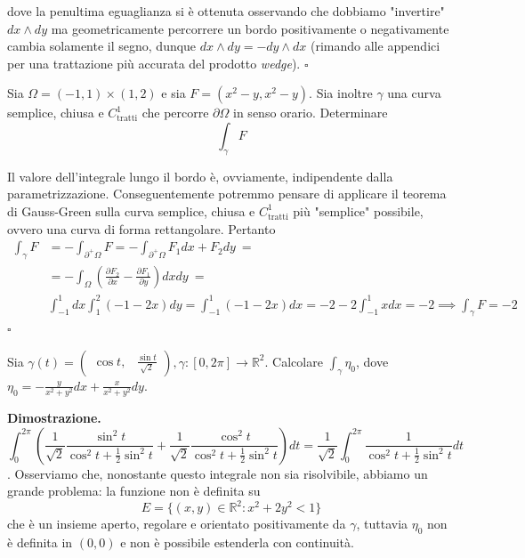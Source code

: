 	dove la penultima eguaglianza si è ottenuta osservando che dobbiamo "invertire" $dx \wedge dy$ ma geometricamente percorrere un bordo positivamente o negativamente cambia solamente il segno, dunque $dx \wedge dy = - dy \wedge dx$ (rimando alle appendici per una trattazione più accurata del prodotto \emph{wedge}).
\hfill $\square$
%
\vspace{0.5cm}
\begin{example}
	Sia $\Omega = (-1, 1) \times (1, 2)$ e sia $F=(x^2 - y, x^2 - y)$. Sia inoltre $\gamma$ una curva semplice, chiusa e $C^1_\text{tratti}$ che percorre $\partial \Omega$ in senso orario. Determinare
	$$
	\int_\gamma F
	$$
\end{example}
%
\noindent {}
	Il valore dell'integrale lungo il bordo è, ovviamente, indipendente dalla parametrizzazione. Conseguentemente potremmo pensare di applicare il teorema di Gauss-Green sulla curva semplice, chiusa e $C^1_\text{tratti}$ più "semplice" possibile, ovvero una curva di forma rettangolare.
	Pertanto
	\[\begin{aligned}
	\int_{\gamma} F 
	&= -\int_{\partial^{+} \Omega} F = - \int_{\partial^{+} \Omega} F_1 dx + F_2 dy\ =\\
	&= - \int_\Omega \left( \frac{\partial F_2}{\partial x} - \frac{\partial F_1}{\partial y} \right) dxdy\ = \\ 
	&\int_{-1}^{1} dx \int_1^2 (-1 - 2x)dy = \int_{-1}^{1} (-1 - 2x)dx = -2 - 2 \int_{-1}^1 xdx = -2 \implies \int_{\gamma} F = - 2
	\end{aligned}\]
\hfill $\square$
%
\vspace{0.5cm}
\begin{example}
	Sia $\gamma(t) = \begin{pmatrix} \cos{t}, & \frac{\sin{t}}{\sqrt{2}} \end{pmatrix}, \gamma: [0, 2\pi] \to \mathbb{R}^2$. Calcolare $\int_\gamma \eta_0$, dove $\eta_0 = - \frac{y}{x^2 + y^2}dx + \frac{x}{x^2 + y^2}dy$.
\end{example}
%
\noindent \textbf{Dimostrazione. }
	$$\int_{0}^{2\pi} \left(\frac{1}{\sqrt{2}} \frac{\sin^2{t}}{\cos^2{t} + \frac{1}{2} \sin^2{t}} + \frac{1}{\sqrt{2}} \frac{\cos^2{t}}{\cos^2{t} + \frac{1}{2} \sin^2{t}} \right)dt = \frac{1}{\sqrt{2}} \int_0^{2\pi} \frac{1}{\cos^2{t} + \frac{1}{2} \sin^2{t}}dt$$. Osserviamo che, nonostante questo integrale non sia risolvibile, abbiamo un grande problema: la funzione non è definita su
	$$
	E = \{(x, y) \in \mathbb{R}^2 : x^2 + 2y^2 < 1 \}
	$$
	che è un insieme aperto, regolare e orientato positivamente da $\gamma$, tuttavia $\eta_0$ non è definita in $(0, 0)$ e non è possibile estenderla con continuità. \\
